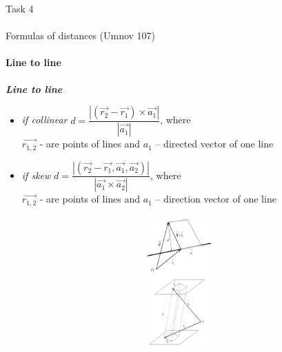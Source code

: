\documentclass[aspectratio=169]{beamer}
\begin{document}
\begin{frame}[t]{Task 4}
    \framesubtitle{}
\end{frame}

\begin{frame}[t]{Formulas of distances (Umnov 107)}
    \framesubtitle{Line to line}
    \begin{minipage}{0.6\textwidth}
        \textbf{\textit{Line to line}}\begin{itemize}
            \item \textit{if collinear} $d = \dfrac{|(\vec{r_2}-\vec{r_1}) \times \vec{a_1}| }{|\vec{a_1}|}$, where \\ $\vec{r_{1,2}}$ - are points of lines and $a_1$ -- directed vector of one line
            \item \textit{if skew} $d = \dfrac{|(\vec{r_2}-\vec{r_1},\vec{a_1},\vec{a_2})| }{|\vec{a_1}\times\vec{a_2}|}$, where \\ $\vec{r_{1,2}}$ - are points of lines and $a_1$ -- direction vector of one line
        \end{itemize}
    \end{minipage}
    \begin{minipage}{0.39\textwidth}
        \begin{figure}[H]
            \centering\includegraphics[height=5cm,width=1\textwidth,keepaspectratio]{distance_2.png}
            \label{fig:distance_2.png}
        \end{figure}
    \end{minipage}
\end{frame}
\end{document}
